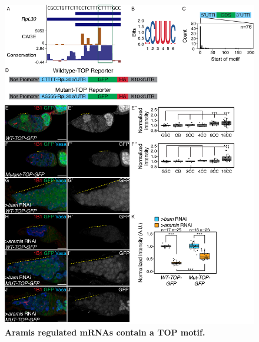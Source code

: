 \documentclass[12pt,oneside]{reedthesis}
\begin{document}
\begin{figure}

{\centering \includegraphics[width=6.5 in,height=8.9375 in]{./figure/Ribosome Biogenesis/Ribosome Biogenesis 6} 

}

\caption[\textbf{Aramis regulated mRNAs contain a TOP motif.}]{\textbf{Aramis regulated mRNAs contain a TOP motif.}}\label{fig:unnamed-chunk-16}
\end{figure}
\end{document}
